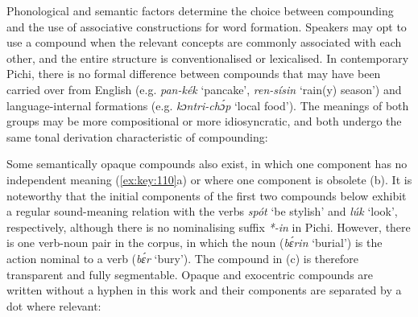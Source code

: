 \begin{table}
\caption{Characteristics of compounding}
\label{tab:key:4.4}
\end{table}

Phonological and semantic factors determine the choice between compounding and the use of associative constructions for word formation. Speakers may opt to use a compound when the relevant concepts are commonly associated with each other, and the entire structure is conventionalised or lexicalised. In contemporary Pichi, there is no formal difference between compounds that may have been carried over from English (e.g. \textit{pan-kék} ‘pancake’, \textit{ren-sísin} ‘rain(y) season’) and language-internal formations (e.g. \textit{kɔntri-chɔ́p} ‘local food’). The meanings of both groups may be more compositional or more idiosyncratic, and both undergo the same tonal derivation characteristic of compounding:


Some semantically opaque compounds also exist, in which one component has no independent meaning (\ref{ex:key:110}a) or where one component is obsolete (b). It is noteworthy that the initial components of the first two compounds below exhibit a regular sound-meaning relation with the verbs \textit{spót} ‘be stylish’ and \textit{lúk} ‘look’, respectively, although there is no nominalising suffix \textit{*-in} in Pichi. However, there is one verb-noun pair in the corpus, in which the noun (\textit{bɛ́rin} ‘burial’) is the action nominal to a verb (\textit{bɛ́r} ‘bury’). The compound in (c) is therefore transparent and fully segmentable. Opaque and exocentric compounds are written without a hyphen in this work and their components are separated by a dot where relevant: 

